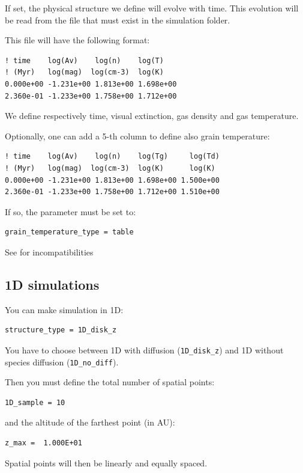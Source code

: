 \documentclass[english,a4paper,twoside]{article}
\begin{document}
If set, the physical structure we define will evolve with time. This evolution will be read from the file  that must exist in the simulation folder. 

This file will have the following format:
\begin{verbatim}
! time    log(Av)    log(n)    log(T)
! (Myr)   log(mag)  log(cm-3)  log(K)
0.000e+00 -1.231e+00 1.813e+00 1.698e+00
2.360e-01 -1.233e+00 1.758e+00 1.712e+00
\end{verbatim}
We define respectively time, visual extinction, gas density and gas temperature. 

Optionally, one can add a 5-th column to define also grain temperature:
\begin{verbatim}
! time    log(Av)    log(n)    log(Tg)     log(Td)
! (Myr)   log(mag)  log(cm-3)  log(K)      log(K)
0.000e+00 -1.231e+00 1.813e+00 1.698e+00 1.500e+00
2.360e-01 -1.233e+00 1.758e+00 1.712e+00 1.510e+00
\end{verbatim}
If so, the parameter  must be set to:
\begin{verbatim}
grain_temperature_type = table
\end{verbatim}

\begin{attention}
See  for incompatibilities
\end{attention}

\subsection{1D simulations}\label{sec:1D}
You can make simulation in 1D:
\begin{verbatim}
structure_type = 1D_disk_z
\end{verbatim}
You have to choose between 1D with diffusion (\verb|1D_disk_z|) and 1D without species diffusion (\verb|1D_no_diff|).


Then you must define the total number of spatial points:
\begin{verbatim}
1D_sample = 10
\end{verbatim}
and the altitude of the farthest point (in AU):
\begin{verbatim}
z_max =  1.000E+01
\end{verbatim}

Spatial points will then be linearly and equally spaced. 
\end{document}
